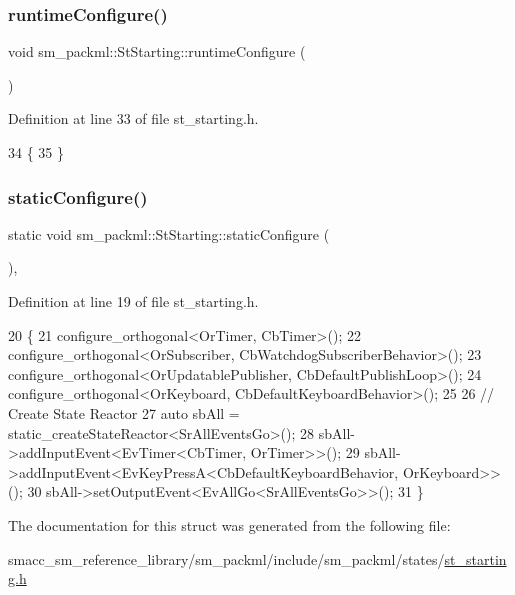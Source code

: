 \subsubsection{\texorpdfstring{runtime\+Configure()}{runtimeConfigure()}}
{\footnotesize\ttfamily void sm\+\_\+packml\+::\+St\+Starting\+::runtime\+Configure (\begin{DoxyParamCaption}{ }\end{DoxyParamCaption})\hspace{0.3cm}{\ttfamily [inline]}}



Definition at line 33 of file st\+\_\+starting.\+h.


\begin{DoxyCode}
34     \{
35     \}
\end{DoxyCode}
\mbox{\label{structsm__packml_1_1StStarting_a41a4418153e0a3756f8f5f93d13aa16d}} 
\subsubsection{\texorpdfstring{static\+Configure()}{staticConfigure()}}
{\footnotesize\ttfamily static void sm\+\_\+packml\+::\+St\+Starting\+::static\+Configure (\begin{DoxyParamCaption}{ }\end{DoxyParamCaption})\hspace{0.3cm}{\ttfamily [inline]}, {\ttfamily [static]}}



Definition at line 19 of file st\+\_\+starting.\+h.


\begin{DoxyCode}
20     \{
21         configure\_orthogonal<OrTimer, CbTimer>();
22         configure\_orthogonal<OrSubscriber, CbWatchdogSubscriberBehavior>();
23         configure\_orthogonal<OrUpdatablePublisher, CbDefaultPublishLoop>();
24         configure\_orthogonal<OrKeyboard, CbDefaultKeyboardBehavior>();
25 
26         \textcolor{comment}{// Create State Reactor}
27         \textcolor{keyword}{auto} sbAll = static\_createStateReactor<SrAllEventsGo>();
28         sbAll->addInputEvent<EvTimer<CbTimer, OrTimer>>();
29         sbAll->addInputEvent<EvKeyPressA<CbDefaultKeyboardBehavior, OrKeyboard>>();
30         sbAll->setOutputEvent<EvAllGo<SrAllEventsGo>>();
31     \}
\end{DoxyCode}


The documentation for this struct was generated from the following file\+:\begin{DoxyCompactItemize}
\item 
smacc\+\_\+sm\+\_\+reference\+\_\+library/sm\+\_\+packml/include/sm\+\_\+packml/states/\hyperlink{st__starting_8h}{st\+\_\+starting.\+h}\end{DoxyCompactItemize}
